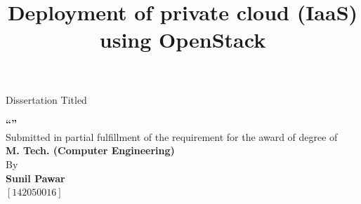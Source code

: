 \begin{titlepage}
\begin{center}
Dissertation Titled\\
\vspace{0.5cm}

\title{Deployment of private cloud (IaaS) using OpenStack}
\makeatletter
\textbf{\LARGE \vspace{0.2cm}\textquotedblleft \@title \textquotedblright }\\
\vspace{0.5cm}
\small Submitted in partial fulfillment of the requirement for the award of degree of\\

\vspace{0.5cm}
{\large \textbf{M. Tech. (Computer Engineering)}}\\
\vspace{0.1cm}
\vspace{0.1cm}
\vspace{0.4cm}
By\\
\vspace{0.2cm}
\large \textbf{Sunil Pawar}\\
\vspace{0.1cm}
$[142050016]$\\


\end{center}
\end{titlepage}
